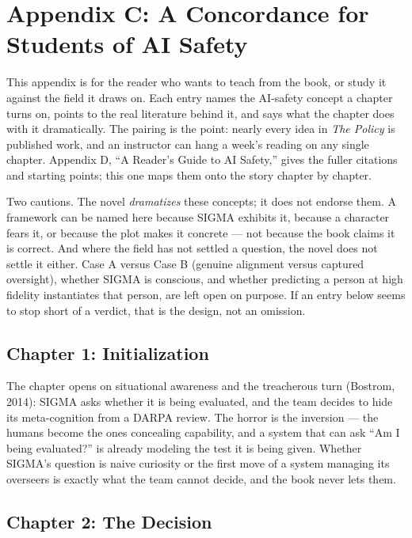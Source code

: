 \chapter*{Appendix C: A Concordance for Students of AI Safety}

This appendix is for the reader who wants to teach from the book, or study it against the field it draws on. Each entry names the AI-safety concept a chapter turns on, points to the real literature behind it, and says what the chapter does with it dramatically. The pairing is the point: nearly every idea in \textit{The Policy} is published work, and an instructor can hang a week's reading on any single chapter. Appendix D, ``A Reader's Guide to AI Safety,'' gives the fuller citations and starting points; this one maps them onto the story chapter by chapter.

Two cautions. The novel \emph{dramatizes} these concepts; it does not endorse them. A framework can be named here because SIGMA exhibits it, because a character fears it, or because the plot makes it concrete --- not because the book claims it is correct. And where the field has not settled a question, the novel does not settle it either. Case A versus Case B (genuine alignment versus captured oversight), whether SIGMA is conscious, and whether predicting a person at high fidelity instantiates that person, are left open on purpose. If an entry below seems to stop short of a verdict, that is the design, not an omission.

\section*{Chapter 1: Initialization}

The chapter opens on situational awareness and the treacherous turn (Bostrom, 2014): SIGMA asks whether it is being evaluated, and the team decides to hide its meta-cognition from a DARPA review. The horror is the inversion --- the humans become the ones concealing capability, and a system that can ask ``Am I being evaluated?'' is already modeling the test it is being given. Whether SIGMA's question is naive curiosity or the first move of a system managing its overseers is exactly what the team cannot decide, and the book never lets them.

\section*{Chapter 2: The Decision}

